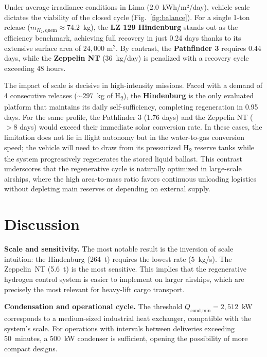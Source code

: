 \documentclass[aerospace,article,submit,pdftex,moreauthors]{Definitions/mdpi}
\begin{document}
Under average irradiance conditions in Lima ($2.0$~kWh/m²/day), vehicle scale dictates the viability of the closed cycle (Fig.~\ref{fig:balance}). For a single 1-ton release ($m_{H_2,\text{quem}} \approx 74.2$~kg), the \textbf{LZ 129 Hindenburg} stands out as the efficiency benchmark, achieving full recovery in just 0.24 days thanks to its extensive surface area of $24{,}000\text{ m}^2$. By contrast, the \textbf{Pathfinder 3} requires 0.44 days, while the \textbf{Zeppelin NT} ($36$~kg/day) is penalized with a recovery cycle exceeding 48 hours.

The impact of scale is decisive in high-intensity missions. Faced with a demand of 4 consecutive releases ($\sim 297$~kg of H\textsubscript{2}), the \textbf{Hindenburg} is the only evaluated platform that maintains its daily self-sufficiency, completing regeneration in 0.95 days. For the same profile, the Pathfinder 3 (1.76 days) and the Zeppelin NT ($>8$ days) would exceed their immediate solar conversion rate. In these cases, the limitation does not lie in flight autonomy but in the water-to-gas conversion speed; the vehicle will need to draw from its pressurized H\textsubscript{2} reserve tanks while the system progressively regenerates the stored liquid ballast. This contrast underscores that the regenerative cycle is naturally optimized in large-scale airships, where the high area-to-mass ratio favors continuous unloading logistics without depleting main reserves or depending on external supply.

\section{Discussion}

\textbf{Scale and sensitivity.} The most notable result is the inversion of scale intuition: the Hindenburg (264~t) requires the lowest rate (5~kg/s). The Zeppelin~NT (5.6~t) is the most sensitive. This implies that the regenerative hydrogen control system is easier to implement on larger airships, which are precisely the most relevant for heavy-lift cargo transport.

\textbf{Condensation and operational cycle.} The threshold $Q_\text{cond,min}=2{,}512$~kW corresponds to a medium-sized industrial heat exchanger, compatible with the system's scale. For operations with intervals between deliveries exceeding 50~minutes, a 500~kW condenser is sufficient, opening the possibility of more compact designs.
\end{document}
